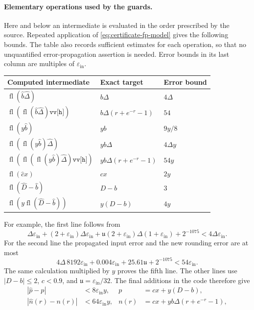 \paragraph{Elementary operations used by the guards.}
Here and below an intermediate is evaluated in the order prescribed by
the source. Repeated application of
\eqref{eq:certificate-fp-model} gives the following bounds. The table
also records sufficient estimates for each operation, so that no
unquantified error-propagation assertion is needed. Error bounds in its
last column are multiples of $\varepsilon_{\mathrm{in}}$.
\begin{center}
\begin{tabular}{lll}
\hline
Computed intermediate & Exact target & Error bound\\
\hline
$\operatorname{fl}(\widehat b\widehat\Delta)$
 &$b\Delta$ &$4\Delta$\\
$\operatorname{fl}(\operatorname{fl}(\widehat b\widehat\Delta)\texttt{vv[h]})$
 &$b\Delta (r+e^{-r}-1)$ &$54$\\
$\operatorname{fl}(y\widehat b)$ &$yb$ &$9y/8$\\
$\operatorname{fl}(\operatorname{fl}(y\widehat b)\widehat\Delta)$
 &$yb\Delta$ &$4\Delta y$\\
$\operatorname{fl}(\operatorname{fl}(\operatorname{fl}(y\widehat b)
       \widehat\Delta)\texttt{vv[h]})$
 &$yb\Delta (r+e^{-r}-1)$ &$54y$\\
$\operatorname{fl}(\widehat c x)$ &$cx$ &$2y$\\
$\operatorname{fl}(\widehat D-\widehat b)$ &$D-b$ &$3$\\
$\operatorname{fl}(y\operatorname{fl}(\widehat D-\widehat b))$
 &$y(D-b)$ &$4y$\\
\hline
\end{tabular}
\end{center}
For example, the first line follows from
\[
 \Delta\varepsilon_{\mathrm{in}}
 +(2+\varepsilon_{\mathrm{in}})\Delta\varepsilon_{\mathrm{in}}
 +\mathfrak u(2+\varepsilon_{\mathrm{in}})
       \Delta(1+\varepsilon_{\mathrm{in}})+2^{-1075}
 <4\Delta\varepsilon_{\mathrm{in}}.
\]
For the second line the propagated input error and the new rounding
error are at most
\[
 4\Delta\,8192\varepsilon_{\mathrm{in}}
 +0.004\varepsilon_{\mathrm{in}}
 +25.61\mathfrak u+2^{-1075}
 <54\varepsilon_{\mathrm{in}}.
\]
The same calculation multiplied by $y$ proves the fifth line.
The other lines use $|D-b|\le2$, $c<0.9$, and
$\mathfrak u=\varepsilon_{\mathrm{in}}/32$.
The final additions in the code therefore give
\begin{align}
 |\widehat p-p|&<8\varepsilon_{\mathrm{in}}y,
 &p&=cx+y(D-b), \label{eq:certificate-p-error}\\
 |\widehat n(r)-n(r)|&<64\varepsilon_{\mathrm{in}}y,
 &n(r)&=cx+yb\Delta (r+e^{-r}-1), \label{eq:certificate-n-error}
\end{align}
